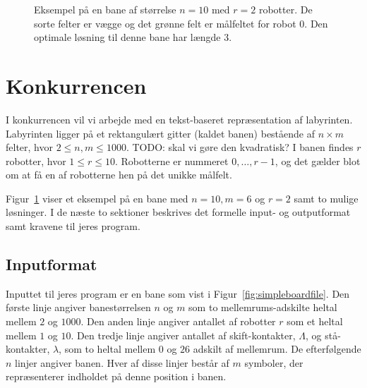 \documentclass[10pt, a4paper]{article}
\begin{document}
\begin{figure}
\centering
{}
\hspace{0.2cm}
\hspace{0.2cm}
\caption{Eksempel på en bane af størrelse $n=10$ med $r=2$ robotter. De sorte felter er vægge og det grønne felt er målfeltet for robot 0. Den optimale løsning til denne bane har længde 3.}
\label{fig:simpleboardexample}
\end{figure}

\section{Konkurrencen}
I konkurrencen vil vi arbejde med en tekst-baseret repræsentation af labyrinten.
Labyrinten ligger på et rektangulært gitter (kaldet banen) bestående af $n \times m$ felter, hvor $2 \leq n,m \leq 1000$. TODO: skal vi gøre den kvadratisk?
I banen findes $r$ robotter, hvor $1 \leq r \leq 10$. Robotterne er nummeret $0, \ldots, r-1$, og det gælder blot om at få en af robotterne hen på det unikke målfelt.

Figur~\ref{fig:simpleboardexample} viser et eksempel på en bane med $n=10, m=6$ og $r=2$ samt to mulige løsninger. I de næste to sektioner beskrives det formelle input- og outputformat samt kravene til jeres program.

\subsection{Inputformat}
Inputtet til jeres program er en bane som vist i Figur~\ref{fig:simpleboardfile}.
Den første linje angiver banestørrelsen $n$ og $m$ som to mellemrums-adskilte heltal mellem $2$ og $1000$.
Den anden linje angiver antallet af robotter $r$ som et heltal mellem $1$ og $10$.
Den tredje linje angiver antallet af skift-kontakter, $\Lambda$, og stå-kontakter, $\lambda$, som to heltal mellem $0$ og $26$ adskilt af mellemrum.
De efterfølgende $n$ linjer angiver banen.
Hver af disse linjer består af $m$ symboler, der repræsenterer indholdet på denne position i banen.
\end{document}
